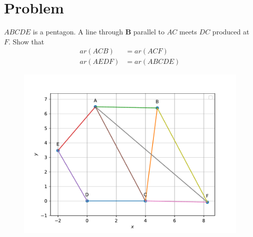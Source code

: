 \documentclass[10pt, a4paper]{article}
\title{\mytitle}
\author{\myauthor\hspace{1em}\\\contact\\FWC22034\hspace{6.5em}IITH\hspace{0.5em}\mymodule\hspace{6em}Assignment}
\let\vec\mathbf
\begin{document}
	\maketitle
	\tableofcontents
   \section{Problem}
   \fi
   $ABCDE$ is a pentagon. A line through
$\vec{B}$ parallel to $AC$ meets $DC$ produced at $F$. Show
that 
\begin{align}
		\label{eq:9/9/3/11}
	ar (ACB) &= ar (ACF)        
\\
	ar (AEDF) &= ar (ABCDE)
		\label{eq:9/9/3/11/pent}
\end{align}
	\begin{figure}[!h]
		\centering
 \includegraphics[width=\columnwidth]{chapters/9/9/3/11/figs/matrix.pdf}
		\caption{}
		\label{fig:9/9/3/11}
  	\end{figure}
\end{document}

